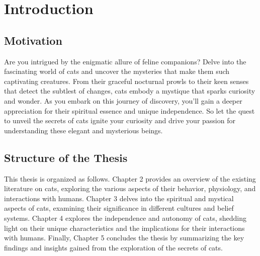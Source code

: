 \chapter{Introduction}

\section{Motivation}
Are you intrigued by the enigmatic allure of feline companions? Delve into the fascinating world of cats and uncover the mysteries that make them such captivating creatures. From their graceful nocturnal prowls to their keen senses that detect the subtlest of changes, cats embody a mystique that sparks curiosity and wonder. As you embark on this journey of discovery, you'll gain a deeper appreciation for their spiritual essence and unique independence. So let the quest to unveil the secrets of cats ignite your curiosity and drive your passion for understanding these elegant and mysterious beings.

\section{Structure of the Thesis}
This thesis is organized as follows. Chapter 2 provides an overview of the existing literature on cats, exploring the various aspects of their behavior, physiology, and interactions with humans. Chapter 3 delves into the spiritual and mystical aspects of cats, examining their significance in different cultures and belief systems. Chapter 4 explores the independence and autonomy of cats, shedding light on their unique characteristics and the implications for their interactions with humans. Finally, Chapter 5 concludes the thesis by summarizing the key findings and insights gained from the exploration of the secrets of cats.